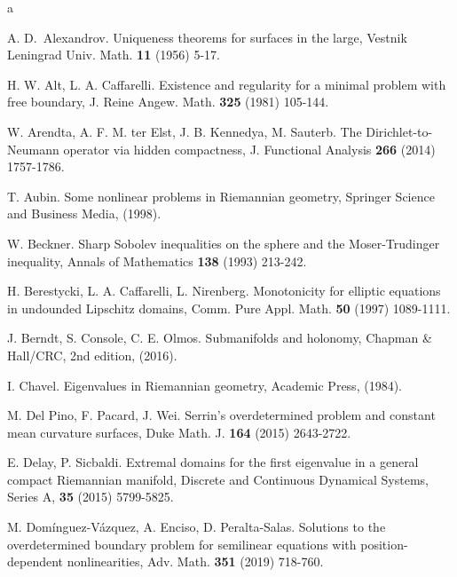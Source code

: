 \documentclass[reqno]{amsart}
\numberwithin{equation}{section}
\newenvironment{key words}{\textbf{Keywords}\mbox{  }}{ }
\begin{document}
\begin{thebibliography}{a}\small

A. D.~Alexandrov. Uniqueness theorems for surfaces in the large, Vestnik Leningrad Univ. Math. {\bf 11} (1956) 5-17.

 H. W. Alt, L. A. Caffarelli. Existence and regularity for a minimal problem with free boundary, J. Reine Angew. Math. {\bf 325} (1981) 105-144.

 W. Arendta, A. F. M. ter Elst, J. B. Kennedya, M. Sauterb. The Dirichlet-to-Neumann operator via hidden compactness, J. Functional Analysis {\bf 266} (2014) 1757-1786.

 T. Aubin. Some nonlinear problems in Riemannian geometry, Springer Science and Business Media, (1998).


 W. Beckner. Sharp Sobolev inequalities on the sphere and the Moser-Trudinger inequality, Annals of Mathematics {\bf 138} (1993) 213-242.

 H. Berestycki, L. A. Caffarelli, L. Nirenberg. Monotonicity for elliptic equations in undounded Lipschitz domains, Comm. Pure Appl. Math. {\bf 50} (1997) 1089-1111.


 J. Berndt, S. Console, C. E. Olmos. Submanifolds and holonomy, Chapman \&
Hall/CRC, 2nd edition, (2016).

 I. Chavel. Eigenvalues in Riemannian geometry, Academic Press, (1984).

 M. Del Pino, F. Pacard, J. Wei. Serrin's overdetermined problem and constant mean curvature surfaces, Duke Math. J. {\bf 164} (2015) 2643-2722.

 E. Delay, P. Sicbaldi. Extremal domains for the first eigenvalue in a general compact Riemannian manifold, Discrete and Continuous Dynamical Systems, Series A, {\bf 35} (2015) 5799-5825.

 M. Dom\'inguez-V\'azquez, A. Enciso, D. Peralta-Salas.
Solutions to the overdetermined boundary problem for semilinear equations with position-dependent nonlinearities,
Adv. Math.  {\bf 351} (2019) 718-760.


\end{thebibliography}
\end{document}
